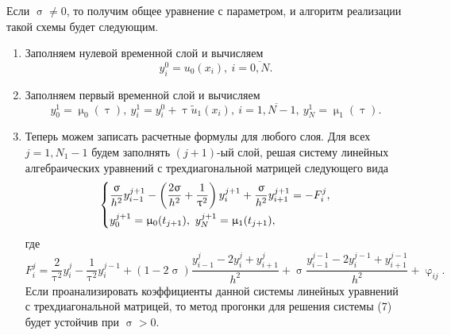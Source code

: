 \documentclass[a4paper, 12pt]{report}
\numberwithin{equation}{section}
\newcommand{\ol}{\overline}
\renewcommand{\varphi}{\upvarphi}
\renewcommand{\tau}{\uptau}
\renewcommand{\sigma}{\upsigma}
\renewcommand{\mu}{\upmu}
\begin{document}
	Если $\sigma \ne 0$, то получим общее уравнение с параметром, и алгоритм реализации такой схемы будет следующим. 
	\begin{enumerate}
		\item Заполняем нулевой временной слой и вычисляем 
		\begin{equation*}
			y_i^0 = u_0(x_i),\ i = \ol{0,N}.
		\end{equation*}
		\item Заполняем первый временной слой и вычисляем 
		\begin{equation*}
			y_0^1 = \mu_0(\tau),\ y_i^1 = y_i^0 + \tau \tilde u_1(x_i),\ i = \ol{1, N-1},\ y_N^1 = \mu_1(\tau).
		\end{equation*}
		\item Теперь можем записать расчетные формулы для любого слоя. Для всех
		$j = {1, N_1-1}$ будем заполнять $(j+1)$-ый слой, решая систему линейных алгебраических уравнений с трехдиагональной матрицей следующего вида
		\begin{equation}
			\begin{dcases}
				\dfrac{\sigma}{h^2} y_{i-1}^{j+1} - \left(\dfrac{2\sigma}{h^2} + \dfrac 1 {\tau^2}\right)y_i^{j+1} + \dfrac{\sigma}{h^2}y_{i+1}^{j+1} = - F_i^j,\\
			y_0^{j+1} = \mu_0(t_{j+1}),\ y_N^{j+1} = \mu_1(t_{j+1}),
			\end{dcases}
		\end{equation}
		где 
		$$F_i^j = \dfrac2{\tau^2}y_i^j - \dfrac{1}{\tau^2}y_i^{j-1} + (1-2\sigma )\dfrac{y_{i-1}^j - 2y_i^j + y_{i+1}^j}{h^2} + \sigma \dfrac{y_{i-1}^{j-1} - 2y_i^{j-1} + y_{i+1}^{j-1}}{h^2} + \varphi_{ij}.$$
		Если проанализировать коэффициенты данной системы линейных уравнений с трехдиагональной матрицей, то метод прогонки для решения системы (7) будет устойчив при $\sigma > 0$.
	\end{enumerate}
\end{document}
